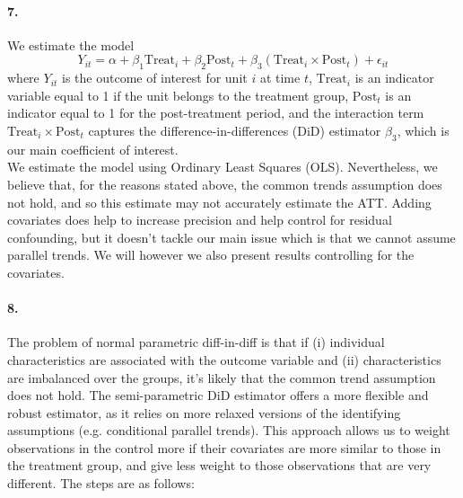 \documentclass{scrartcl}
\begin{document}
\paragraph*{7.}

We estimate the model
$$
Y_{it} = \alpha + \beta_1 \text{Treat}_i + \beta_2 \text{Post}_t + \beta_3 (\text{Treat}_i \times \text{Post}_t) + \epsilon_{it}
$$
where \( Y_{it} \) is the outcome of interest for unit \( i \) at time \( t \), \( \text{Treat}_i \) is an indicator variable equal to 1 if the unit belongs to the treatment group, \( \text{Post}_t \) is an indicator equal to 1 for the post-treatment period, and the interaction term \( \text{Treat}_i \times \text{Post}_t \) captures the difference-in-differences (DiD) estimator \( \beta_3 \), which is our main coefficient of interest. \\

We estimate the model using Ordinary Least Squares (OLS). Nevertheless, we believe that, for the reasons stated above, the common trends assumption does not hold, and so this estimate may not accurately estimate the ATT. Adding covariates does help to increase precision and help control for residual confounding, but it doesn't tackle our main issue which is that we cannot assume parallel trends. We will however we also present results controlling for the covariates.



\paragraph*{8.} 
The problem of normal parametric diff-in-diff is that if (i) individual characteristics are associated with the outcome variable and (ii) characteristics are imbalanced over the groups, it's likely that the common trend assumption does not hold. The semi-parametric DiD estimator offers a more flexible and robust estimator, as it relies on more relaxed versions of the identifying assumptions (e.g. conditional parallel trends). This approach allows us to weight observations in the control more if their covariates are more similar to those in the treatment group, and give less weight to those observations that are very different. The steps are as follows:
\end{document}
